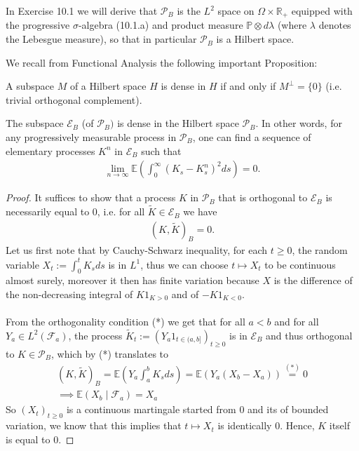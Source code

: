 \documentclass[../mainfile.tex]{subfiles}
\begin{document}
\begin{rem} In Exercise 10.1 we will derive that $\mathcal{P}_B$ is the $L^2$ space on $\Omega \times \mathbb{R}_+$ equipped with the progressive $\sigma$-algebra (10.1.a) and product measure $\mathbb{P} \otimes d \lambda$ (where $\lambda$ denotes the Lebesgue measure), so that in particular $\mathcal{P}_B$ is a Hilbert space. 
\end{rem}
\newpage
We recall from Functional Analysis the following important Proposition:
\begin{prop} A subspace $M$ of a Hilbert space $H$ is dense in $H$ if and only if $M^\perp = \{0\}$ (i.e. trivial orthogonal complement).
\end{prop}
\begin{lem} The subspace $\mathcal{E}_B$ (of $\mathcal{P}_B)$ is dense in the Hilbert space $\mathcal{P}_B$. In other words, for any progressively measurable process in $\mathcal{P}_B$, one can find a sequence of elementary processes $K^n$ in $\mathcal{E}_B$ such that 
\begin{align*}
\lim_{n \to \infty} \mathbb{E} \left( \int_0^\infty (K_s-K_s^n)^2 ds \right)=0. 
\end{align*}
\end{lem}
\begin{proof}
It suffices to show that a process $K$ in $\mathcal{P}_B$ that is orthogonal to $\mathcal{E}_B$ is necessarily equal to $0$, i.e. for all $\tilde{K} \in \mathcal{E}_B$ we have 
\begin{align*}
(K,\tilde{K})_B=0. \tag{*}
\end{align*}
Let us first note that by Cauchy-Schwarz inequality, for each $t \geq 0$, the random variable $X_t:= \int_0^t K_sds$ is in $L^1$, thus we can choose $t \mapsto X_t$ to be continuous almost surely, moreover it then has finite variation because $X$ is the difference of the non-decreasing integral of $K1_{K >0}$ and of $-K1_{K < 0}$. 
\\\\
From the orthogonality condition (*) we get that for all $a <b$ and for all $Y_a \in L^2( \mathcal{F}_a)$, the process $\tilde{K}_t:=(Y_a 1_{t \in (a,b]})_{t \geq 0}$ is in $\mathcal{E}_B$ and thus orthogonal to $K \in \mathcal{P}_B$, which by (*) translates to 
\begin{align*}
(K,\tilde{K})_B=\mathbb{E}( Y_a \int_a^b K_sds)=\mathbb{E}(Y_a (X_b-X_a))\overset{(*)}=0 \\
\implies \mathbb{E}(X_b \mid \mathcal{F}_a)= X_a
\end{align*}
So $(X_t)_{t \geq 0}$ is a continuous martingale started from $0$ and its of bounded variation, we know that this implies that $t \mapsto X_t$ is identically $0$. Hence, $K$ itself is equal to $0$. 
\end{proof}
\newpage
\end{document}
